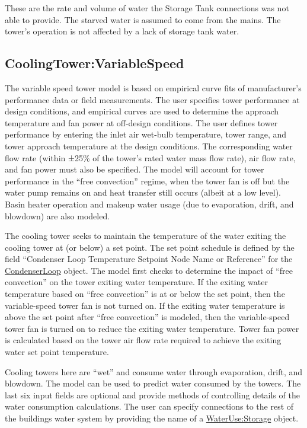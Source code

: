 These are the rate and volume of water the Storage Tank connections was not able to provide. The starved water is assumed to come from the mains. The tower's operation is not affected by a lack of storage tank water.

\subsection{CoolingTower:VariableSpeed}\label{coolingtowervariablespeed}

The variable speed tower model is based on empirical curve fits of manufacturer's performance data or field measurements. The user specifies tower performance at design conditions, and empirical curves are used to determine the approach temperature and fan power at off-design conditions. The user defines tower performance by entering the inlet air wet-bulb temperature, tower range, and tower approach temperature at the design conditions. The corresponding water flow rate (within ±25\% of the tower's rated water mass flow rate), air flow rate, and fan power must also be specified. The model will account for tower performance in the ``free convection'' regime, when the tower fan is off but the water pump remains on and heat transfer still occurs (albeit at a low level). Basin heater operation and makeup water usage (due to evaporation, drift, and blowdown) are also modeled.

The cooling tower seeks to maintain the temperature of the water exiting the cooling tower at (or below) a set point. The set point schedule is defined by the field ``Condenser Loop Temperature Setpoint Node Name or Reference'' for the \hyperref[condenserloop]{CondenserLoop} object. The model first checks to determine the impact of ``free convection'' on the tower exiting water temperature. If the exiting water temperature based on ``free convection'' is at or below the set point, then the variable-speed tower fan is not turned on. If the exiting water temperature is above the set point after ``free convection'' is modeled, then the variable-speed tower fan is turned on to reduce the exiting water temperature. Tower fan power is calculated based on the tower air flow rate required to achieve the exiting water set point temperature.

Cooling towers here are ``wet'' and consume water through evaporation, drift, and blowdown. The model can be used to predict water consumed by the towers. The last six input fields are optional and provide methods of controlling details of the water consumption calculations. The user can specify connections to the rest of the buildings water system by providing the name of a \hyperref[waterusestorage]{WaterUse:Storage} object.

